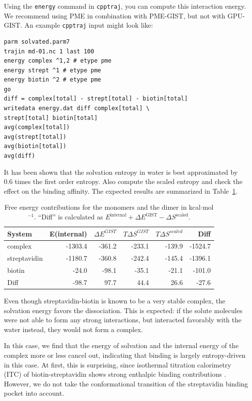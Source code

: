 \documentclass[9pt,tutorial]{livecoms}
\newcommand{\software}{\texttt}
\newcommand\inlinecode{\texttt}
\begin{document}
Using the \inlinecode{energy} command in \software{cpptraj}, you can compute this interaction energy.
We recommend using PME in combination with PME-GIST, but not with GPU-GIST\@.
An example \software{cpptraj} input might look like:
\begin{lstlisting}[style=cpptraj]
parm solvated.parm7
trajin md-01.nc 1 last 100
energy complex ^1,2 # etype pme
energy strept ^1 # etype pme
energy biotin ^2 # etype pme
go
diff = complex[total] - strept[total] - biotin[total]
writedata energy.dat diff complex[total] \
strept[total] biotin[total]
avg(complex[total])
avg(strept[total])
avg(biotin[total])
avg(diff)
\end{lstlisting}

It has been shown \cite{Chen2021,Waibl2022-gist-solvents} that the solvation entropy in water is best approximated by 0.6 times the first order entropy.
Also compute the scaled entropy and check the effect on the binding affinity.
The expected results are summarized in Table~\ref{tab_dg_monomers_dimer}.


\begin{table}[h]
	\caption{Free energy contributions for the monomers and the dimer in kcal$\cdot$mol$^{-1}$. ``Diff'' is calculated as $E^\text{internal} + \Delta E^\text{GIST} - \Delta S^\text{scaled}$.}\label{tab_dg_monomers_dimer}
	\small
	\begin{tabular}{@{}lrrrrr@{}}
		\toprule
		System       & E(internal) & $\Delta E^\textit{GIST}$ & $T\Delta S^\textit{GIST}$ & $T\Delta S^\textit{scaled}$ & Diff \\
		\midrule
		complex      & -1303.4 & -361.2 & -233.1 & -139.9 & -1524.7 \\
		streptavidin & -1180.7 & -360.8 & -242.4 & -145.4 & -1396.1 \\
		biotin       & -24.0   &  -98.1 &  -35.1 &  -21.1 &  -101.0 \\
		Diff         & -98.7   &   97.7 &   44.4 &   26.6 &   -27.6 \\
		\bottomrule
	\end{tabular}
\end{table}

Even though streptavidin-biotin is known to be a very stable complex, the solvation energy favors the dissociation.
This is expected: if the solute molecules were not able to form any strong interactions, but interacted favorably with the water instead, they would not form a complex.

In this case, we find that the energy of solvation and the internal energy of the complex more or less cancel out, indicating that binding is largely entropy-driven in this case.
At first, this is surprising, since isothermal titration calorimetry (ITC) of biotin-streptavidin shows strong enthalpic binding contributions \cite{mpye2020-biotin-itc,hyre2006-biotin-itc}.
However, we do not take the conformational transition of the streptavidin binding pocket into account.
\end{document}

